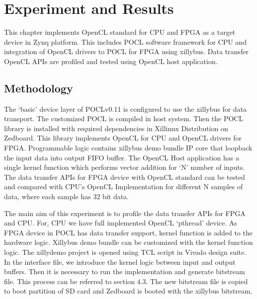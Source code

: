 \chapter{Experiment and Results}
\label{ch5_Experiment_and_Results}

This chapter implements OpenCL standard for CPU and FPGA as a target device in Zynq platform. This includes POCL software framework for CPU and integration of OpenCL drivers to POCL for FPGA using xillybus. Data transfer OpenCL APIs are profiled and tested using OpenCL host application.

\section{Methodology}
The ‘basic’ device layer of POCLv0.11 is configured to use the xillybus for data transport. The customized POCL is compiled in host system. Then the POCL library is installed with required dependencies in Xillinux Distribution on Zedboard. This library implements OpenCL for CPU and OpenCL drivers for FPGA. Programmable logic contains xillybus demo bundle IP core that loopback the input data into output FIFO buffer. The OpenCL Host application has a single kernel function which performs vector addition for ‘N’ number of inputs. The data transfer APIs for FPGA device with OpenCL standard can be tested and compared with CPU's OpenCL Implementation for different N samples of data, where each sample has 32 bit data.

The main aim of this experiment is to profile the data transfer APIs for FPGA and CPU. For, CPU we have full implemented OpenCL ‘pthread’ device. As FPGA device in POCL has data transfer support, kernel function is added to the hardware logic. Xillybus demo bundle can be customized with the kernel function logic. The xillydemo project is opened using TCL script in Vivado design suite. In the interface file, we introduce the kernel logic between input and output buffers. Then it is necessary to run the implementation and generate bitstream file. This process can be referred to section 4.3. The new bitstream file is copied to boot partition of SD card and Zedboard is booted with the xillybus bitstream.
 
